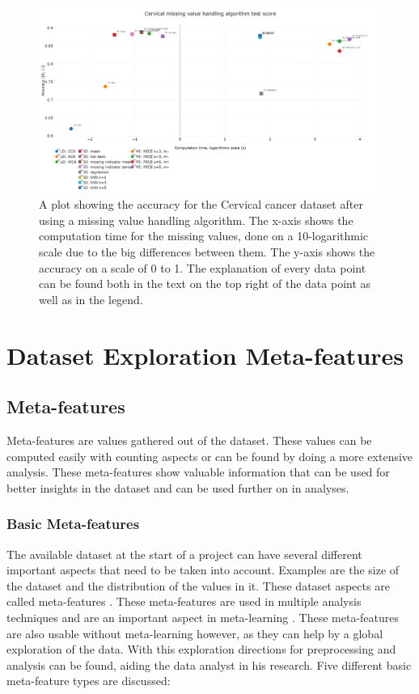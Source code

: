 \documentclass[10pt,a4paper]{report}
\begin{document}
	\begin{figure}[H]
		\centering
		\includegraphics[angle=90,height=0.9\textheight]{cerv_acc.PNG}
		\caption{A plot showing the accuracy for the Cervical cancer dataset after using a missing value handling algorithm. The x-axis shows the computation time for the missing values, done on a 10-logarithmic scale due to the big differences between them. The y-axis shows the accuracy on a scale of 0 to 1. The explanation of every data point can be found both in the text on the top right of the data point as well as in the legend.}
		\label{fig:EvalCervhAcc}
	\end{figure}
	
	\chapter{Dataset Exploration Meta-features}
		
	
	\section{Meta-features}
	\label{app:MetaFeatures}
	
	Meta-features are values gathered out of the dataset. These values can be computed easily with counting aspects or can be found by doing a more extensive analysis. These meta-features show valuable information that can be used for better insights in the dataset and can be used further on in analyses.
	
	\subsection{Basic Meta-features}
	\label{subsec:BasicMF}
	
	The available dataset at the start of a project can have several different important aspects that need to be taken into account. Examples are the size of the dataset and the distribution of the values in it. These dataset aspects are called meta-features \cite{kluegl2009meta}. These meta-features are used in multiple analysis techniques and are an important aspect in meta-learning \cite{kluegl2009meta, castiello2005meta, vilalta2002perspective, bourbakis2011extracting}. These meta-features are also usable without meta-learning however, as they can help by a global exploration of the data. With this exploration directions for preprocessing and analysis can be found, aiding the data analyst in his research. Five different basic meta-feature types are discussed:
	
\end{document}
